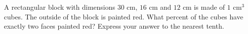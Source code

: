 A rectangular block with dimensions $30$ cm, $16$ cm and $12$ cm is made of $1$ cm$^3$ cubes. The outside of the block is painted red. What percent of the cubes have exactly two faces painted red? Express your answer to the nearest tenth.
